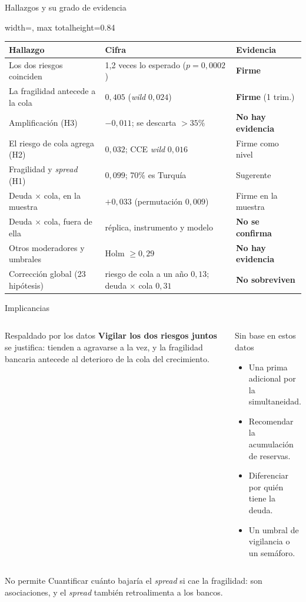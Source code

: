 \documentclass[aspectratio=169]{beamer}
\begin{document}
\begin{frame}{Hallazgos y su grado de evidencia}
\centering
\renewcommand{\arraystretch}{1.4}
\begin{adjustbox}{width=\textwidth, max totalheight=0.84\textheight}
\begin{tabular}{lll}
\toprule
\textbf{Hallazgo} & \textbf{Cifra} & \textbf{Evidencia} \\
\midrule
Los dos riesgos coinciden & 1,2 veces lo esperado ($p=0{,}0002$) & \textbf{Firme} \\
La fragilidad antecede a la cola & $0{,}405$ (\textit{wild} $0{,}024$) & \textbf{Firme} (1 trim.) \\
Amplificación (H3) & $-0{,}011$; se descarta $>35\%$ & \textbf{No hay evidencia} \\
El riesgo de cola agrega (H2) & $0{,}032$; CCE \textit{wild} $0{,}016$ & Firme como nivel \\
Fragilidad y \textit{spread} (H1) & $0{,}099$; 70\% es Turquía & Sugerente \\
Deuda $\times$ cola, en la muestra & $+0{,}033$ (permutación $0{,}009$) & Firme en la muestra \\
Deuda $\times$ cola, fuera de ella & réplica, instrumento y modelo & \textbf{No se confirma} \\
Otros moderadores y umbrales & Holm $\geq0{,}29$ & \textbf{No hay evidencia} \\
Corrección global (23 hipótesis) & riesgo de cola a un año $0{,}13$; deuda $\times$ cola $0{,}31$ & \textbf{No sobreviven} \\
\bottomrule
\end{tabular}
\end{adjustbox}
\end{frame}

\begin{frame}{Implicancias}
\begin{columns}[T]
\begin{block}{Respaldado por los datos}
\small
\textbf{Vigilar los dos riesgos juntos} se justifica: tienden a agravarse a la vez, y la fragilidad bancaria antecede al deterioro de la cola del crecimiento.
\end{block}
\begin{exampleblock}{Sin base en estos datos}
\small
\begin{itemize}
\item Una prima adicional por la simultaneidad.
\item Recomendar la acumulación de reservas.
\item Diferenciar por quién tiene la deuda.
\item Un umbral de vigilancia o un semáforo.
\end{itemize}
\end{exampleblock}
\end{columns}
\vspace{8pt}
\begin{alertblock}{No permite}
Cuantificar cuánto bajaría el \textit{spread} si cae la fragilidad: son asociaciones, y el \textit{spread} también retroalimenta a los bancos.
\end{alertblock}
\end{frame}
\end{document}
